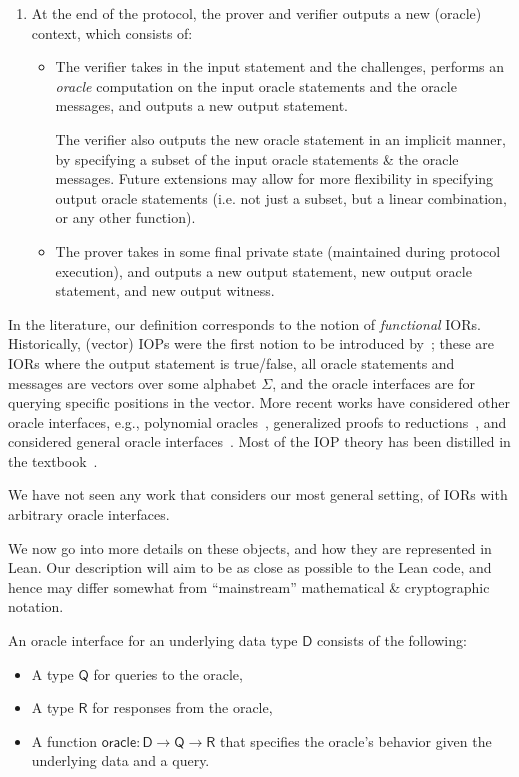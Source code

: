 \begin{enumerate}
    \item At the end of the protocol, the prover and verifier outputs a new (oracle) context, which consists of:
    \begin{itemize}
        \item The verifier takes in the input statement and the challenges, performs an \emph{oracle} computation on the input oracle statements and the oracle messages, and outputs a new output statement.

        The verifier also outputs the new oracle statement in an implicit manner, by specifying a
        subset of the input oracle statements \& the oracle messages. Future extensions may allow for more flexibility in specifying output oracle statements (i.e. not just a subset, but a linear combination, or any other function).
        \item The prover takes in some final private state (maintained during protocol execution), and outputs a new output statement, new output oracle statement, and new output witness.
    \end{itemize}
\end{enumerate}

\begin{remark}
In the literature, our definition corresponds to the notion of \emph{functional} IORs. Historically,
(vector) IOPs were the first notion to be introduced by~\cite{IOPs}; these are IORs where the output
statement is true/false, all oracle statements and messages are vectors over some alphabet $\Sigma$,
and the oracle interfaces are for querying specific positions in the vector. More recent works have
considered other oracle interfaces, e.g., polynomial oracles~\cite{Marlin, DARK}, generalized proofs
to reductions~\cite{ARoK, WARP, Arc, fics-facs}, and considered general oracle
interfaces~\cite{WHIR}. Most of the IOP theory has been distilled in the
textbook~\cite{ChiesaYogev2024}.

We have not seen any work that considers our most general setting, of IORs with arbitrary oracle interfaces.
\end{remark}

We now go into more details on these objects, and how they are represented in Lean. Our description will aim to be as close as possible to the Lean code, and hence may differ somewhat from ``mainstream'' mathematical \& cryptographic notation.

\begin{definition}
    \label{def:oracle_interface}
    An oracle interface for an underlying data type $\mathsf{D}$ consists of the following:
    \begin{itemize}
        \item A type $\mathsf{Q}$ for queries to the oracle,
        \item A type $\mathsf{R}$ for responses from the oracle,
        \item A function $\mathsf{oracle} : \mathsf{D} \to \mathsf{Q} \to \mathsf{R}$ that specifies
        the oracle's behavior given the underlying data and a query.
    \end{itemize}
\end{definition}

